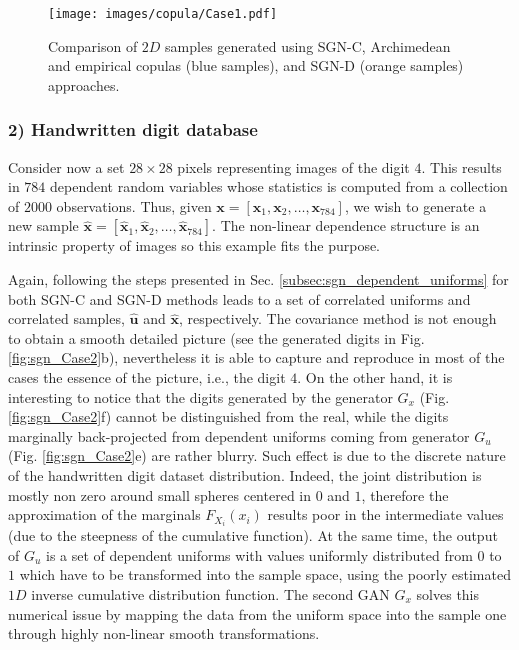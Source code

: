 \begin{figure}
\centering
\texttt{[image: images/copula/Case1.pdf]}
\caption{Comparison of $2D$ samples generated using SGN-C, Archimedean and empirical copulas (blue samples), and SGN-D (orange samples) approaches.}
\label{fig:sgn_Case1}
\end{figure}

\subsubsection{2) Handwritten digit database}
Consider now a set $28\times 28$ pixels representing images of the digit $4$. This results in $784$ dependent random variables whose statistics is computed from a collection of $2000$ observations. Thus, given $\mathbf{x} = [\mathbf{x}_1, \mathbf{x}_2, \dots, \mathbf{x}_{784}]$, we wish to generate a new sample $\mathbf{\hat{x}} = [\mathbf{\hat{x}}_1, \mathbf{\hat{x}}_2,\dots, \mathbf{\hat{x}}_{784}]$. The non-linear dependence structure is an intrinsic property of images so this example fits the purpose.

Again, following the steps presented in Sec. \ref{subsec:sgn_dependent_uniforms} for both SGN-C and SGN-D methods leads to a set of correlated uniforms and correlated samples, $\mathbf{\hat{u}}$ and $ \mathbf{\hat{x}}$, respectively. The covariance method is not enough to obtain a smooth detailed picture (see the generated digits in Fig. \ref{fig:sgn_Case2}b), nevertheless it is able to capture and reproduce in most of the cases the essence of the picture, i.e., the digit $4$. 
On the other hand, it is interesting to notice that the digits generated by the generator $G_x$ (Fig. \ref{fig:sgn_Case2}f) cannot be distinguished from the real, while the digits marginally back-projected from dependent uniforms coming from generator $G_u$ (Fig. \ref{fig:sgn_Case2}e) are rather blurry. Such effect is due to the discrete nature of the handwritten digit dataset distribution. Indeed, the joint distribution is mostly non zero around small spheres centered in $0$ and $1$, therefore the approximation of the marginals $F_{X_i}(x_i)$ results poor in the intermediate values (due to the steepness of the cumulative function). At the same time, the output of $G_u$ is a set of dependent uniforms with values uniformly distributed from $0$ to $1$ which have to be transformed into the sample space, using the poorly estimated $1D$ inverse cumulative distribution function. The second GAN $G_x$ solves this numerical issue by mapping the data from the uniform space into the sample one through highly non-linear smooth transformations. 

